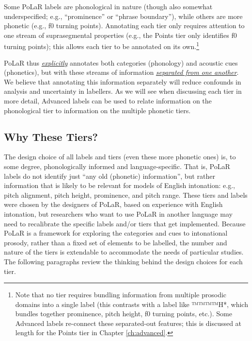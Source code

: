 \documentclass[11pt, twoside]{memoir}
\begin{document}
Some PoLaR labels are phonological in nature (though also somewhat underspecified; e.g., “prominence” or “phrase boundary”), while others are more phonetic (e.g., f0 turning points). Annotating each tier only requires attention to one stream of suprasegmental properties (e.g., the Points tier only identifies f0 turning points); this allows each tier to be annotated on its own.\footnote{Note that no tier requires bundling information from multiple prosodic domains into a single label (this contrasts with a label like ™™™™{H*}, which bundles together prominence, pitch height, f0 turning points, etc.). Some Advanced labels re-connect these separated-out features; this is discussed at length for the Points tier in Chapter \ref{ch:advanced}.\label{fn:no bundling}}

PoLaR thus \textit{\uline{explicitly}} annotates both categories (phonology) and acoustic cues (phonetics), but with these streams of information \textit{\uline{separated from one another}}. We believe that annotating this information separately will reduce confounds in analysis and uncertainty in labellers. As we will see when discussing each tier in more detail, Advanced labels can be used to relate information on the phonological tier to information on the multiple phonetic tiers.

\subsection{Why These Tiers?}\label{sec:why-these-tiers}

The design choice of all labels and tiers (even these more phonetic ones) is, to some degree, phonologically informed and language-specific. That is, PoLaR labels do not identify just “any old (phonetic) information”, but rather information that is likely to be relevant for models of English intonation: e.g., pitch alignment, pitch height, prominence, and pitch range. These tiers and labels were chosen by the designers of PoLaR, based on experience with English intonation, but researchers who want to use PoLaR in another language may need to recalibrate the specific labels and/or tiers that get implemented. Because PoLaR is a framework for exploring the categories and cues to intonational prosody, rather than a fixed set of elements to be labelled, the number and nature of the tiers is extendable to accommodate the needs of particular studies. The following paragraphs review the thinking behind the design choices for each tier.
\end{document}
